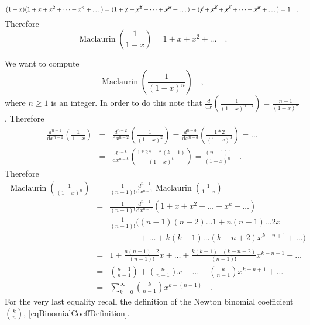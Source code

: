 \documentclass[12pt]{book}
\newcommand{\diff}{\text{d}}
\DeclareMathOperator{\maclaurin}{Maclaurin}
\begin{document}
\[
(1-x)(1+x+x^2+\dots +x^n+\dots) = (1+\cancel{x}+\cancel{x^2}+\dots +\cancel{x^n} +\dots)- (\cancel{x}+\cancel{x^2}+\cancel{x^3}+\dots + \cancel{x^n}+\dots)= 1\quad . 
\]
Therefore 
\begin{equation}\label{eqInfiniteGeometricProgression}
\maclaurin \left( \frac{1}{1-x}\right)= 1+x+x^2+\dots \quad .
\end{equation}

We want to compute
\[
\maclaurin\left(\frac{1}{(1-x)^n}\right)\quad ,
\]
where $n\geq 1$ is an integer. In order to do this note that $\frac{d}{\diff x}\left(\frac{1}{(1-x)^{n-1}}\right)= \frac{n-1}{(1-x)^{n}} $. Therefore 
\[
\begin{array}{rcl}
\displaystyle \frac{d^{n-1}}{\diff x^{n-1}} \left(\frac{1}{1-x}\right)&=&\displaystyle  \frac{d^{n-2}}{ \diff x^{n-2}} \left(\frac{1}{(1-x)^2}\right)= \frac{d^{n-3} }{\diff x^{ n-3}}\left(\frac{1*2}{(1-x)^3}\right) = \dots \\&=&\displaystyle \frac{d^{ n-k}}{ \diff x^{n-k} }\left( \frac{1 *2* \dots *(k-1)}{(1-x)^{k}}\right)= \frac{(n-1)!}{(1-x)^n} \quad .
\end{array}
\]
Therefore 
\[\begin{array}{rcl}
\displaystyle \maclaurin\left(\frac{1}{(1-x)^n}\right)&=& \displaystyle \frac{1}{(n-1)!}\frac{d^{n-1}}{\diff x^{n-1}} \maclaurin \left(\frac{1}{1-x}\right)\\
&=& \displaystyle
\frac{1}{(n-1)!}\frac{d^{n-1}}{\diff x^{n-1}}(1+x+x^2+\dots +x^k+\dots )\\
&=& \displaystyle \frac{1}{(n-1)!}( (n-1)(n-2)\dots 1+n(n-1)\dots 2 x \\
&&\displaystyle \phantom{\frac{1}{(n-1)!}( }+  \dots + k(k-1)\dots (k-n+2)x^{k-n+1}+\dots )\\
&=&\displaystyle 1+ \frac{n (n-1)\dots 2}{(n-1)!} x + \dots + \frac{ k(k-1)\dots (k-n+2)}{(n-1)!}x^{k-n+1}+\dots \\
&=&\displaystyle \binom{ n-1}{n-1} + \binom{n}{n-1}x+\dots + \binom{k}{n-1}x^{k-n+1}+\dots \\
&=&\displaystyle\sum_{k=0}^\infty \binom {k}{n-1}x^{k-(n-1)}\quad .
\end{array}
\]
For the very last equality recall the definition of the Newton binomial coefficient $\binom{k}{n}$, \eqref{eqBinomialCoeffDefinition}. 
\end{document}
